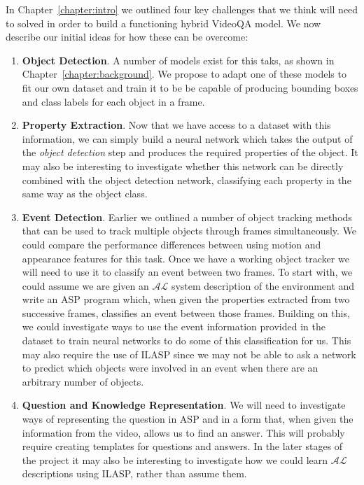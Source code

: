 \documentclass[../interim.tex]{subfiles}
\begin{document}
In Chapter~\ref{chapter:intro} we outlined four key challenges that we think will need to solved in order to build a functioning hybrid VideoQA model. We now describe our initial ideas for how these can be overcome:
\begin{enumerate}
  \item \textbf{Object Detection}. A number of models exist for this taks, as shown in Chapter~\ref{chapter:background}. We propose to adapt one of these models to fit our own dataset and train it to be be capable of producing bounding boxes and class labels for each object in a frame.

  \item \textbf{Property Extraction}. Now that we have access to a dataset with this information, we can simply build a neural network which takes the output of the \textit{object detection} step and produces the required properties of the object. It may also be interesting to investigate whether this network can be directly combined with the object detection network, classifying each property in the same way as the object class.

  \item \textbf{Event Detection}. Earlier we outlined a number of object tracking methods that can be used to track multiple objects through frames simultaneously. We could compare the performance differences between using motion and appearance features for this task. Once we have a working object tracker we will need to use it to classify an event between two frames. To start with, we could assume we are given an $\mathcal{AL}$ system description of the environment and write an ASP program which, when given the properties extracted from two successive frames, classifies an event between those frames. Building on this, we could investigate ways to use the event information provided in the dataset to train neural networks to do some of this classification for us. This may also require the use of ILASP since we may not be able to ask a network to predict which objects were involved in an event when there are an arbitrary number of objects.

  \item \textbf{Question and Knowledge Representation}. We will need to investigate ways of representing the question in ASP and in a form that, when given the information from the video, allows us to find an answer. This will probably require creating templates for questions and answers. In the later stages of the project it may also be interesting to investigate how we could learn $\mathcal{AL}$ descriptions using ILASP, rather than assume them.
\end{enumerate}
\end{document}
